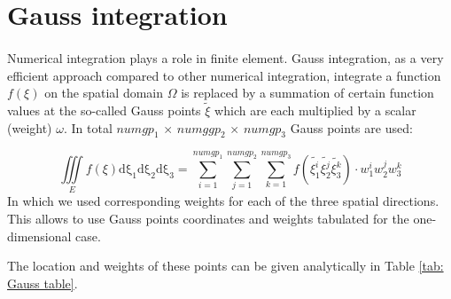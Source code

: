 \section{Gauss integration}
\paragraph{}
Numerical integration plays a role in finite element. Gauss integration, as a very efficient approach compared to other numerical integration, integrate a function $f(\xi)$ on the spatial domain $\Omega$ is replaced by a summation of certain function values at the so-called Gauss points $\tilde{\xi}$ which are each multiplied by a scalar (weight) $\omega$. In total $numgp_1$ $\times$ $numggp_2$ $\times$ $numgp_3$ Gauss points are used:

\begin{equation}
\iiint \limits_E f\left(\xi\right) \mathrm{d\xi_1}\mathrm{d\xi_2}\mathrm{d\xi_3} = \displaystyle\sum_{i=1}^{numgp_1}\displaystyle\sum_{j=1}^{numgp_2} \displaystyle\sum_{k=1}^{numgp_3} f\left(\tilde{\xi_1^i}\tilde{\xi_2^j}\tilde{\xi_3^k}\right)\cdot w_1^i w_2^j w_3^k 
\end{equation}
In which we used corresponding weights for each of the three spatial directions. This allows to use Gauss points coordinates and weights tabulated for the one-dimensional case.

The location and weights of these points can be given analytically in Table \ref{tab: Gauss table}.

